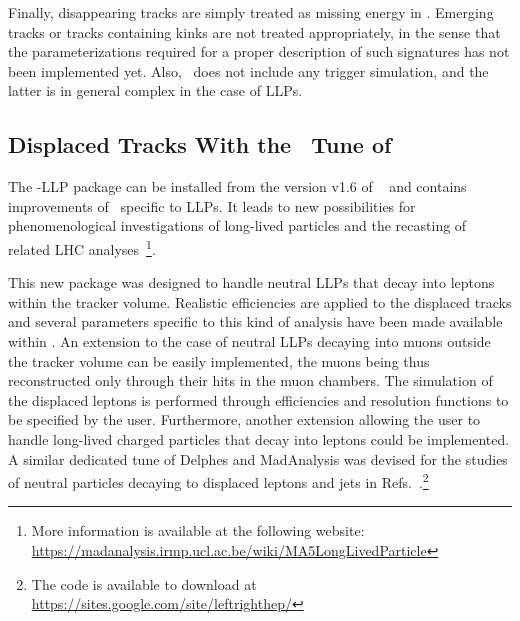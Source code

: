 Finally, disappearing tracks are simply treated as missing energy in \DEL. Emerging tracks or tracks containing kinks are not treated appropriately, in the sense that the parameterizations required for a proper description of such signatures has not been implemented yet. Also, \DEL\ does not include any trigger simulation, and the latter is in general complex in the case of LLPs.

\subsection{Displaced Tracks With the \MA\ Tune of \DEL}

The \DEL-LLP package can be installed from the version v1.6 of
\MA~\cite{Conte:2012fm,Conte:2014zja} and contains improvements of \DEL\
specific to LLPs. It leads to new possibilities for phenomenological investigations of long-lived
particles and the recasting of related LHC analyses~\footnote{More information is
available at the following website:\\ \noindent \url{https://madanalysis.irmp.ucl.ac.be/wiki/MA5LongLivedParticle}}.

This new package was designed to handle neutral LLPs that decay
into leptons within the tracker volume. Realistic efficiencies are applied to
the displaced tracks and several parameters specific to this kind of analysis
have been made available within \MA. An extension to the case of neutral
LLPs decaying into muons outside the tracker volume can be easily
implemented, the muons being thus reconstructed only through their hits in the
muon chambers. The simulation of the displaced leptons is performed through efficiencies and resolution functions to be specified by the user. Furthermore, another
extension allowing the user to handle long-lived charged particles that decay into
leptons could be implemented. A similar dedicated tune of {\sc Delphes} and {\sc MadAnalysis} was devised for the studies of neutral particles decaying to displaced leptons and jets in Refs.~\cite{Maiezza:2015lza,Nemevsek:2016enw,Nemevsek:2018bbt}.\footnote{The code is available to download at \url{https://sites.google.com/site/leftrighthep/}}

